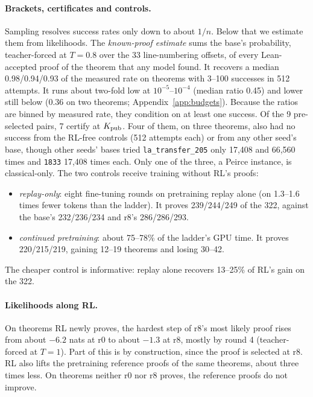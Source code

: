 \paragraph{Brackets, certificates and controls.} Sampling resolves success rates only down to about $1/n$. Below that we
estimate them from likelihoods. The \emph{known-proof estimate} sums the base's probability, teacher-forced at $T=0.8$
over the 33 line-numbering offsets, of every Lean-accepted proof of the theorem that any model found. It recovers a
median 0.98/0.94/0.93 of the measured rate on theorems with 3--100 successes in 512 attempts. It runs about two-fold low
at $10^{-5}$--$10^{-4}$ (median ratio 0.45) and lower still below (0.36 on two theorems; Appendix~\ref{app:budgets}).
Because the ratios are binned by measured rate, they condition on at least one success. Of the 9 pre-selected pairs, 7
certify at $K_{\mathrm{pub}}$. Four of them, on three theorems, also had no success from the RL-free controls (512 attempts each)
or from any other seed's base, though other seeds' bases tried \texttt{la\_transfer\_205} only 17,408 and 66,560 times
and \texttt{1833} 17,408 times each. Only one of the three, a Peirce instance, is classical-only. The two controls
receive training without RL's proofs:
\begin{itemize}
\item \emph{replay-only}: eight fine-tuning rounds on pretraining replay alone (on 1.3--1.6 times fewer tokens than
the ladder). It proves 239/244/249 of the 322,
against the base's 232/236/234 and r8's 286/286/293.
\item \emph{continued pretraining}: about 75--78\% of the ladder's GPU time. It proves 220/215/219, gaining 12--19
theorems and losing 30--42.
\end{itemize}
The cheaper control is informative: replay alone recovers 13--25\% of RL's gain on the 322.

\paragraph{Likelihoods along RL.} On theorems RL newly proves, the hardest step of r8's most likely proof rises from
about $-6.2$ nats at r0 to about $-1.3$ at r8, mostly by round 4 (teacher-forced at $T=1$). Part of this is by
construction, since the proof is selected at r8. RL also lifts the pretraining reference proofs of the same theorems,
about three times less. On theorems neither r0 nor r8 proves, the reference proofs do not improve.

